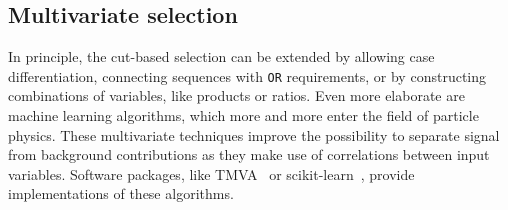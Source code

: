 
\subsection{Multivariate selection}
\label{sec:dataanalysis:selection:bdt}

In principle, the cut-based selection can be extended by allowing case
differentiation, \ie connecting sequences with \texttt{OR} requirements, or by
constructing combinations of variables, like products or ratios. Even more
elaborate are machine learning algorithms, which more and more enter the field
of particle physics. These multivariate techniques improve the possibility to
separate signal from background contributions as they make use of correlations
between input variables. Software packages, like TMVA~\cite{Hocker:2007ht} or
scikit-learn~\cite{scikit-learn}, provide implementations of these algorithms.

